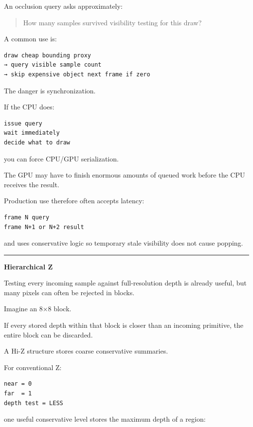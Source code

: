 An occlusion query asks approximately:

\begin{quote}
How many samples survived visibility testing for this draw?
\end{quote}

A common use is:

\begin{verbatim}
draw cheap bounding proxy
→ query visible sample count
→ skip expensive object next frame if zero
\end{verbatim}

The danger is synchronization.

If the CPU does:

\begin{verbatim}
issue query
wait immediately
decide what to draw
\end{verbatim}

you can force CPU/GPU serialization.

The GPU may have to finish enormous amounts of queued work before the CPU receives the result.

Production use therefore often accepts latency:

\begin{verbatim}
frame N query
frame N+1 or N+2 result
\end{verbatim}

and uses conservative logic so temporary stale visibility does not cause popping.

\begin{center}\rule{0.5\linewidth}{0.5pt}\end{center}

\textbf{Hierarchical Z}

Testing every incoming sample against full-resolution depth is already useful, but many pixels can often be rejected in blocks.

Imagine an 8×8 block.

If every stored depth within that block is closer than an incoming primitive, the entire block can be discarded.

A Hi-Z structure stores coarse conservative summaries.

For conventional Z:

\begin{verbatim}
near = 0
far  = 1
depth test = LESS
\end{verbatim}

one useful conservative level stores the maximum depth of a region:

